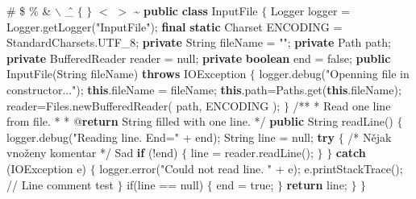 \codetexNewline
\typosize[8/0]
 \# \$ \% \& $\backslash$ \^ \_ $\{$ $\}$  $<$ $>$ \~\codetexNewline
{} {\bf {\localcolor \Blue public}} {\bf {\localcolor \Blue class}} InputFile $\{$\codetexNewline
{} Logger logger = Logger.getLogger({\localcolor \Yellow "InputFile"});\codetexNewline
{} {\bf {\localcolor \Blue final}} {\bf {\localcolor \Blue static}} Charset ENCODING = StandardCharsets.UTF\_8;\codetexNewline
{} \codetexNewline
{} {\bf {\localcolor \Blue private}} String fileName = {\localcolor \Yellow ""};\codetexNewline
{} {\bf {\localcolor \Blue private}} Path path;\codetexNewline
{} {\bf {\localcolor \Blue private}} BufferedReader reader = null;\codetexNewline
{} {\bf {\localcolor \Blue private}} {\bf {\localcolor \Blue boolean}} end = false;\codetexNewline
{} \codetexNewline
{} {\bf {\localcolor \Blue public}} InputFile(String fileName) {\bf {\localcolor \Blue throws}} IOException $\{$\codetexNewline
{} logger.debug({\localcolor \Yellow "Openning file in constructor..."});\codetexNewline
{} {\bf {\localcolor \Blue this}}.fileName = fileName;\codetexNewline
{} {\bf {\localcolor \Blue this}}.path=Paths.get({\bf {\localcolor \Blue this}}.fileName);\codetexNewline
{} reader=Files.newBufferedReader( path, ENCODING );\codetexNewline
{} $\}$\codetexNewline
{} \codetexNewline
{} {\localcolor \Grey /**\codetexNewline}
{\localcolor \Grey {} * Read one line from file.\codetexNewline}
{\localcolor \Grey {} *\codetexNewline}
{\localcolor \Grey {} * @{\bf {\localcolor \Blue return}} String filled with one line.\codetexNewline}
{\localcolor \Grey {} */}\codetexNewline
{} {\bf {\localcolor \Blue public}} String readLine() $\{$\codetexNewline
{} logger.debug({\localcolor \Yellow "Reading line. End="} + end);\codetexNewline
{} String line = null;\codetexNewline
{} \codetexNewline
{} {\bf {\localcolor \Blue try}} $\{$ {\localcolor \Grey /* Nějak vnoženy\codetexNewline}
{\localcolor \Grey {} komentar */} Sad\codetexNewline
{} {\bf {\localcolor \Blue if}} (!end) $\{$\codetexNewline
{} line = reader.readLine();\codetexNewline
{} $\}$\codetexNewline
{} $\}$ {\bf {\localcolor \Blue catch}} (IOException e) $\{$\codetexNewline
{} logger.error({\localcolor \Yellow "Could not read line. "} + e);\codetexNewline
{} e.printStackTrace(); {\localcolor \Grey // Line comment test\codetexNewline}
 $\}$\codetexNewline
{} \codetexNewline
{} if(line == null) $\{$\codetexNewline
{} end = true;\codetexNewline
{} $\}$\codetexNewline
{} \codetexNewline
{} {\bf {\localcolor \Blue return}} line;\codetexNewline
{} $\}$\codetexNewline
{} $\}$\codetexNewline
\typosize[12/] \codetexNewline

